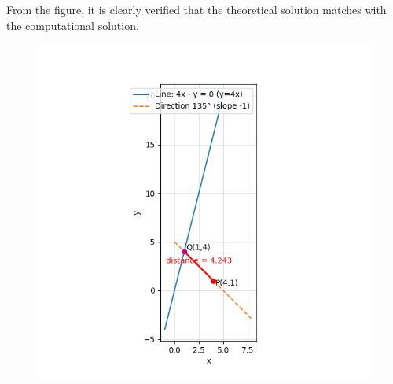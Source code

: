 \documentclass[journal]{IEEEtran}
\begin{document}
From the figure, it is clearly verified that the theoretical solution matches with the computational solution.\\
\begin{figure}[H]
    \centering
    \includegraphics[width=0.6\columnwidth]{figs/Figure_1.png}
    \label{fig:1}
\end{figure}
\end{document}

